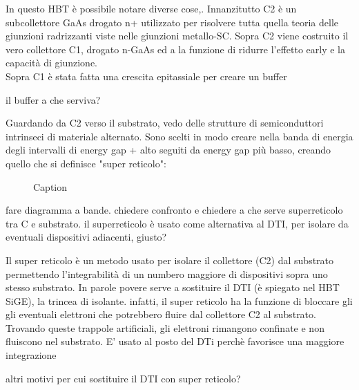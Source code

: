 In questo HBT è possibile notare diverse cose,. Innanzitutto C2 è un subcollettore GaAs drogato n+ utilizzato per risolvere tutta quella teoria delle giunzioni radrizzanti viste nelle giunzioni metallo-SC.
Sopra C2 viene costruito il vero collettore C1, drogato n-GaAs ed a la funzione di ridurre l'effetto early e la capacità di giunzione.\\
Sopra C1 è stata fatta una crescita epitassiale per creare un buffer
\begin{ricevimento}
    il buffer a che serviva?
\end{ricevimento}
Guardando da C2 verso il substrato, vedo delle strutture di semiconduttori intrinseci di materiale alternato. Sono scelti in modo creare nella banda di energia degli intervalli di energy gap + alto seguiti da energy gap più basso, creando quello che si definisce "super reticolo":
\begin{figure}[hbt!]
    \centering
    \caption{Caption}%
    \label{fig:enter-label}
\end{figure}
\begin{ricevimento}
    fare diagramma a bande. chiedere confronto e chiedere a che serve superreticolo tra C e substrato.
    il superreticolo è usato come alternativa al DTI, per isolare da eventuali dispositivi adiacenti, giusto?
\end{ricevimento}
Il super reticolo è un metodo usato per isolare il collettore (C2) dal substrato permettendo l'integrabilità di un numbero maggiore di dispositivi sopra uno stesso substrato.
In parole povere serve a sostituire il DTI (è spiegato nel HBT SiGE), la trincea di isolante. infatti, il super reticolo  ha la funzione di bloccare gli gli eventuali elettroni che potrebbero fluire dal collettore C2 al substrato. Trovando queste trappole artificiali, gli elettroni rimangono confinate e non fluiscono nel substrato.
E' usato al posto del DTi perchè favorisce una maggiore integrazione
\begin{ricevimento}
    altri motivi per cui sostituire il DTI con super reticolo?
\end{ricevimento}

